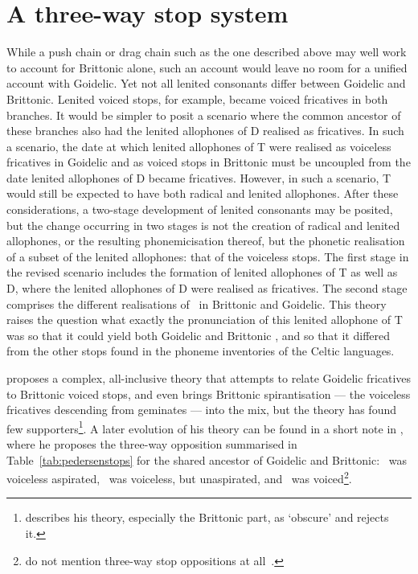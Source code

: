 \section{A three-way stop system}
\label{sec:three-way-stop}
While a push chain or drag chain such as the one described above may well work to account for Brittonic alone, such an account would leave no room for a unified account with Goidelic. Yet not all lenited consonants differ between Goidelic and Brittonic. Lenited voiced stops, for example, became voiced fricatives in both branches. It would be simpler to posit a scenario where the common ancestor of these branches also had the lenited allophones of \gls{D} realised as fricatives. In such a scenario, the date at which lenited allophones of \gls{T} were realised as voiceless fricatives in Goidelic and as voiced stops in Brittonic must be uncoupled from the date lenited allophones of \gls{D} became fricatives. However, in such a scenario, \gls{T} would still be expected to have both radical and lenited allophones.  After these considerations, a two-stage development of lenited consonants may be posited, but the change occurring in two stages is not the creation of radical and lenited allophones, or the resulting phonemicisation thereof, but the phonetic realisation of a subset of the lenited allophones: that of the voiceless stops. The first stage in the revised scenario includes the formation of lenited allophones of \gls{T} as well as \gls{D}, where the  lenited allophones of \gls{D} were realised as fricatives. The second stage  comprises the different realisations of \lT\ in Brittonic and Goidelic. This theory raises the question what exactly the pronunciation of this lenited \gls{allophone} of \gls{T} was so that it could yield both Goidelic and Brittonic \lT, and so that it differed from the other stops found in the \gls{phoneme} inventories of the Celtic languages.

\Textcite{Ped_Aspirationen97} proposes a complex, all-inclusive theory that attempts  to relate  Goidelic  fricatives to Brittonic voiced stops, and even brings Brittonic spirantisation — the voiceless fricatives descending from geminates — into the mix, but the theory has found few supporters\footnote{\Textcite{Str_Erschienene99} describes his theory, especially the Brittonic part, as `obscure' and rejects it.}. A later evolution of his theory can be found in a short note in  \textcite[§§~149,~303]{Ped_Vergleichende09}, where he proposes the  three-way opposition summarised in Table~\ref{tab:pedersenstops} for the shared ancestor of Goidelic and Brittonic: \xT\ was voiceless aspirated, \lT\ was voiceless, but unaspirated, and \xD\ was voiced\footnote{\Textcite{LP_Concise37} do not mention three-way stop oppositions at all~\autocite[§~131]{jackson_language_1953}.}.

